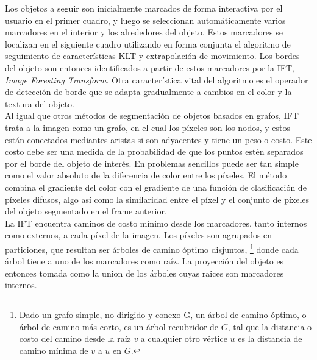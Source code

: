 \documentclass[a4paper,10pt]{article}
\begin{document}
Los objetos a seguir son inicialmente marcados de forma interactiva por el usuario en el primer cuadro, y luego se seleccionan automáticamente
varios marcadores en el interior y los alrededores del objeto. Estos marcadores se localizan en el siguiente cuadro utilizando en forma
conjunta el algoritmo de
seguimiento de características KLT \cite{KLT} y extrapolación de movimiento. Los bordes del objeto son entonces identificados a partir de estos marcadores por la IFT, 
\textit{Image Foresting Transform}\cite{IFT}. Otra característica vital del algoritmo es el operador de detección de borde que se adapta gradualmente a cambios en el 
color y la textura del objeto. \\

Al igual que otros métodos de segmentación de objetos basados en grafos, IFT trata a la imagen como un grafo, en el cual los píxeles son los nodos, y
estos están conectados mediantes aristas si son adyacentes y tiene un peso o costo. Este costo debe ser una medida de la probabilidad de que 
los puntos estén separados por el borde del objeto de interés. En problemas sencillos puede ser tan simple como el valor absoluto de la diferencia de color 
entre los píxeles. El método combina el gradiente del color con el gradiente de una función de clasificación de píxeles difusos, algo así como la similaridad entre el píxel 
y el conjunto de píxeles del objeto segmentado en el frame anterior. \\

La IFT encuentra caminos de costo mínimo desde los marcadores, tanto internos como externos, a cada píxel de la imagen. Los píxeles son agrupados en particiones, que 
resultan ser árboles de camino óptimo disjuntos,
\footnote{Dado un grafo simple, no dirigido y conexo G, un árbol de camino óptimo, o árbol de camino más corto, es un árbol recubridor de $G$, tal que la distancia o
costo del camino desde la raíz $v$ a cualquier otro vértice $u$ es la distancia de camino mínima de $v$ a $u$ en $G$.}
donde cada árbol tiene a uno de los marcadores como raíz. La proyección del objeto es entonces tomada como la union de los árboles cuyas raices 
son marcadores internos.\\
\end{document}
